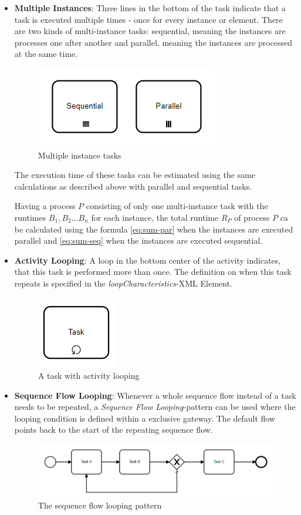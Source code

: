 \begin{itemize}
	
	\item \textbf{Multiple Instances}: Three lines in the bottom of the task indicate that a task is executed multiple times - once for every instance or element. There are two kinds of multi-instance tasks: sequential, meaning the instances are processes one after another and parallel, meaning the instances are processed at the same time. 
	\begin{figure}[H]
		\centering
		\includegraphics[width=0.4\columnwidth]{graphics/multi-instance-tasks}
		\caption{Multiple instance tasks} 
		\label{fig:muliti-instance-tasks} 
	\end{figure}
	The execution time of these tasks can be estimated using the same calculations as described above with parallel and sequential tasks.
	
	Having a process $P$ consisting of only one multi-instance task with the runtimes $B_1,B_2 ... B_n$ for each instance, the total runtime $R_P$ of process $P$ ca be calculated using the formula \ref{eq:sum-par} when the instances are executed parallel and \ref{eq:sum-seq} when the instances are executed sequential. 

	\item \textbf{Activity Looping}: A loop in the bottom center of the activity indicates, that this task is performed more than once. The definition on when this task repeats is specified in the \textit{loopCharacteristics}-XML Element.
	\begin{figure}[H]
		\centering
		\includegraphics[width=0.2\columnwidth]{graphics/looped-task}
		\caption{A task with activity looping} 
		\label{fig:activity-looping} 
	\end{figure}
	\item \textbf{Sequence Flow Looping}: Whenever a whole sequence flow instead of a task needs to be repeated, a \textit{Sequence Flow Looping}-pattern can be used where the looping condition is defined within a exclusive gateway. The default flow points back to the start of the repeating sequence flow. 
	\begin{figure}[H]
		\centering
		\includegraphics[width=0.9\columnwidth]{graphics/sequence-flow-looping}
		\caption{The sequence flow looping pattern} 
		\label{fig:sequence-flow-looping} 
	\end{figure}


\end{itemize}
